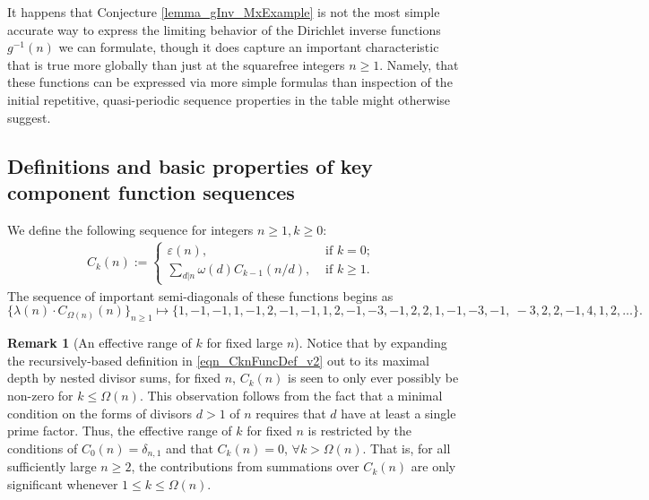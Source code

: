 \documentclass[11pt,reqno,a4letter]{article}
\numberwithin{figure}{section}
\numberwithin{table}{section}
\newcommand{\seqnum}[1]{\href{http://oeis.org/#1}{\color{ProcessBlue}{\underline{#1}}}}
\theoremstyle{plain}
\numberwithin{theorem}{section}
\theoremstyle{definition}
\newtheorem{remark}[theorem]{Remark}
\begin{document}
It happens that Conjecture \ref{lemma_gInv_MxExample} is not the most 
simple accurate way to express the limiting behavior of the 
Dirichlet inverse functions $g^{-1}(n)$ we can formulate, 
though it does capture an important characteristic that is true more globally than just at the 
squarefree integers $n \geq 1$. Namely, that these 
functions can be expressed via more simple formulas than inspection of the initial 
repetitive, quasi-periodic sequence properties in the table might otherwise suggest. 

\subsection{Definitions and basic properties of key component function sequences} 

We define the following sequence for integers $n \geq 1, k \geq 0$: 
\begin{align} 
\label{eqn_CknFuncDef_v2} 
C_k(n) := \begin{cases} 
     \varepsilon(n), & \text{ if $k = 0$; } \\ 
     \sum\limits_{d|n} \omega(d) C_{k-1}(n/d), & \text{ if $k \geq 1$. } 
     \end{cases} 
\end{align} 
The sequence of important semi-diagonals of these functions begins as 
\cite[\seqnum{A008480}]{OEIS} 
\[
\{\lambda(n) \cdot C_{\Omega(n)}(n) \}_{n \geq 1} \mapsto \{
     1, -1, -1, 1, -1, 2, -1, -1, 1, 2, -1, -3, -1, 2, 2, 1, -1, -3, -1, \
     -3, 2, 2, -1, 4, 1, 2, \ldots \}. 
\]

\begin{remark}[An effective range of $k$ for fixed large $n$]
Notice that by expanding the recursively-based definition in \eqref{eqn_CknFuncDef_v2} 
out to its maximal depth by nested divisor sums, for fixed $n$, $C_k(n)$ is seen to 
only ever possibly be non-zero for $k \leq \Omega(n)$. 
This observation follows from the fact that 
a minimal condition on the forms of 
divisors $d > 1$ of $n$ requires that $d$ have at least a single prime factor. 
Thus, the effective range of $k$ for fixed $n$ is restricted by the 
conditions of $C_0(n) = \delta_{n,1}$ and that $C_k(n) = 0$, $\forall k > \Omega(n)$. 
That is, for all sufficiently large $n \geq 2$, the contributions from 
summations over $C_k(n)$ are only significant whenever $1 \leq k \leq \Omega(n)$. 
\end{remark} 
\end{document}
